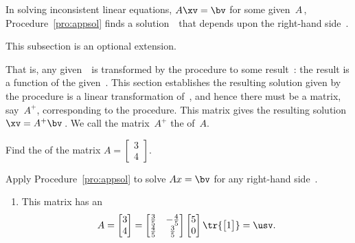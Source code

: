 
In solving inconsistent linear equations, \(A\xv=\bv\) for some given~\(A\)\,, Procedure~\ref{pro:appsol} finds a solution~\xv\ that depends upon the right-hand side~\bv.
\begin{aside}
This subsection is an optional extension.
\end{aside}
That is, any given~\bv\ is transformed by the procedure to some result~\xv: the result is a function of the given~\bv.
This section establishes the resulting solution given by the procedure is a linear transformation of~\bv, and hence there must be a matrix, say~\(A^+\), corresponding to the procedure. 
This matrix gives the resulting solution \(\xv=A^+\bv\)\,.
We call the matrix~\(A^+\) the  of~\(A\).

\begin{example} \label{eg:psinv34}
Find the  of the matrix \(A=\begin{bmatrix} 3\\4 \end{bmatrix}\).
\begin{solution} 
Apply Procedure~\ref{pro:appsol} to solve \(Ax=\bv\) for any right-hand side~\bv.
\begin{enumerate}
\item This matrix has an \svd\ 
\begin{equation*}
A=\begin{bmatrix} 3\\4 \end{bmatrix}
=\begin{bmatrix} \frac35&-\frac45\\\frac45&\frac35 \end{bmatrix}
\begin{bmatrix} 5\\0 \end{bmatrix}\tr{\begin{bmatrix} 1 \end{bmatrix}}
=\usv.
\end{equation*}


\end{enumerate}
\end{solution}
\end{example}
